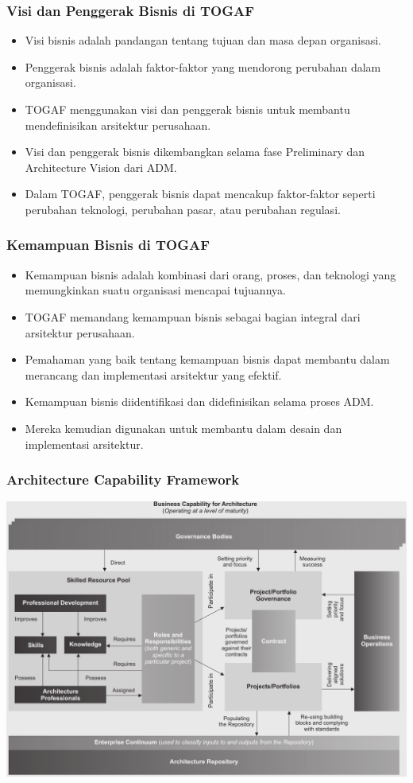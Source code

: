 \documentclass[aspectratio=169]{beamer}
\begin{document}
	\begin{frame}
		\frametitle{Visi dan Penggerak Bisnis di TOGAF}
		\begin{itemize}
			\item Visi bisnis adalah pandangan tentang tujuan dan masa depan organisasi.
			\item Penggerak bisnis adalah faktor-faktor yang mendorong perubahan dalam organisasi.
			\item TOGAF menggunakan visi dan penggerak bisnis untuk membantu mendefinisikan arsitektur perusahaan.
			\item Visi dan penggerak bisnis dikembangkan selama fase Preliminary dan Architecture Vision dari ADM.
			\item Dalam TOGAF, penggerak bisnis dapat mencakup faktor-faktor seperti perubahan teknologi, perubahan pasar, atau perubahan regulasi.
		\end{itemize}
	\end{frame}
	
	\begin{frame}
		\frametitle{Kemampuan Bisnis di TOGAF}
		\begin{itemize}
			\item Kemampuan bisnis adalah kombinasi dari orang, proses, dan teknologi yang memungkinkan suatu organisasi mencapai tujuannya.
			\item TOGAF memandang kemampuan bisnis sebagai bagian integral dari arsitektur perusahaan.
			\item Pemahaman yang baik tentang kemampuan bisnis dapat membantu dalam merancang dan implementasi arsitektur yang efektif.
			\item Kemampuan bisnis diidentifikasi dan didefinisikan selama proses ADM.
			\item Mereka kemudian digunakan untuk membantu dalam desain dan implementasi arsitektur.
		\end{itemize}
	\end{frame}
	
	{
		\begin{frame}
			\frametitle{Architecture Capability Framework}
			\begin{center}
				\includegraphics[width=.80\textwidth]{../figures/architecture_capability_framework}
			\end{center}
		\end{frame}
	}
	
\end{document}
